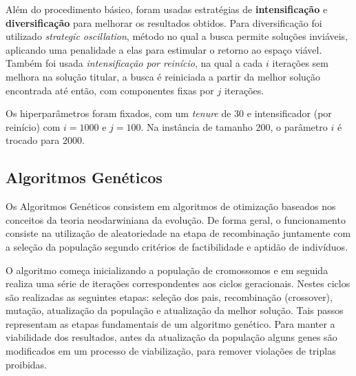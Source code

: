 \documentclass{MO824}
\begin{document}

Além do procedimento básico, foram usadas estratégias de \textbf{intensificação} e \textbf{diversificação} para melhorar os resultados obtidos. Para diversificação foi utilizado \textit{strategic oscillation}, método no qual a busca permite soluções inviáveis, aplicando uma penalidade a elas para estimular o retorno ao espaço viável. Também foi usada \textit{intensificação por reinício}, na qual a cada $i$ iterações sem melhora na solução titular, a busca é reiniciada a partir da melhor solução encontrada até então, com componentes fixas por $j$ iterações.

Os hiperparâmetros foram fixados, com um \textit{tenure} de 30 e intensificador (por reinício) com $i=1000$ e $j=100$. Na instância de tamanho 200, o parâmetro $i$ é trocado para 2000.

\subsection{Algoritmos Genéticos} \label{ga}
Os Algoritmos Genéticos consistem em algoritmos de otimização baseados nos conceitos da teoria neodarwiniana da evolução. De forma geral, o funcionamento consiste na utilização de aleatoriedade na etapa de recombinação juntamente com a seleção da população segundo critérios de factibilidade e aptidão de indivíduos.

O algoritmo começa inicializando a população de cromossomos e em seguida realiza uma série de iterações correspondentes aos ciclos geracionais. Nestes ciclos são realizadas as seguintes etapas: seleção dos pais, recombinação (crossover), mutação, atualização da população e atualização da melhor solução. Tais passos representam as etapas fundamentais de um algoritmo genético. Para manter a viabilidade dos resultados, antes da atualização da população alguns genes são modificados em um processo de viabilização, para remover violações de triplas proibidas.
\end{document}
